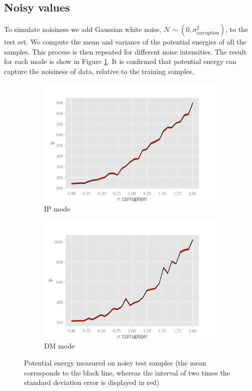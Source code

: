 \subsection*{Noisy values}
To simulate noisiness we add Gaussian white noise, $\mathcal{N} \sim (0,\sigma_{\text{corruption}}^2)$, to the test set. We compute the mean and variance of the potential energies of all the samples. This process is then repeated for different noise intensities. The result for each mode is show in Figure \ref{fig:pot-noisy-signal}. It is confirmed that potential energy can capture the noisiness of data, relative to the training samples.
\begin{figure}[!h]
\centering
\begin{subfigure}{.5\textwidth}
  \centering
  \includegraphics[width=\linewidth]{figures/noisy-signal-ip}
  \caption{IP mode}
\end{subfigure}%
\begin{subfigure}{.5\textwidth}
  \centering
  \includegraphics[width=\linewidth]{figures/noisy-signal-dm-snr}
  \caption{DM mode}
\end{subfigure}
\caption{Potential energy measured on noisy test samples (the mean corresponds to the black line, whereas the interval of two times the standard deviation error is displayed in red)}
\label{fig:pot-noisy-signal}
\end{figure}

